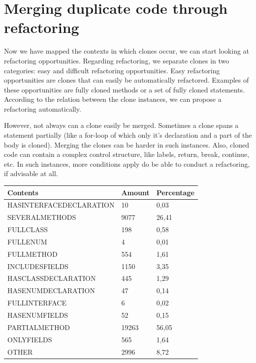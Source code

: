 \documentclass[a4paper]{article}
\begin{document}

\section{Merging duplicate code through refactoring}
Now we have mapped the contexts in which clones occur, we can start looking at refactoring opportunities. Regarding refactoring, we separate clones in two categories: easy and difficult refactoring opportunities. Easy refactoring opportunities are clones that can easily be automatically refactored. Examples of these opportunities are fully cloned methods or a set of fully cloned statements. According to the relation between the clone instances, we can propose a refactoring automatically.

However, not always can a clone easily be merged. Sometimes a clone spans a statement partially (like a for-loop of which only it's declaration and a part of the body is cloned). Merging the clones can be harder in such instances. Also, cloned code can contain a complex control structure, like labels, return, break, continue, etc. In such instances, more conditions apply do be able to conduct a refactoring, if advisable at all.

\begin{table}[H]
\begin{tabular}{|l|l|l|}
\hline
\textbf{Contents}       & \textbf{Amount} & \textbf{Percentage} \\ \hline
HASINTERFACEDECLARATION & 10              & 0,03                \\ \hline
SEVERALMETHODS          & 9077            & 26,41               \\ \hline
FULLCLASS               & 198             & 0,58                \\ \hline
FULLENUM                & 4               & 0,01                \\ \hline
FULLMETHOD              & 554             & 1,61                \\ \hline
INCLUDESFIELDS          & 1150            & 3,35                \\ \hline
HASCLASSDECLARATION     & 445             & 1,29                \\ \hline
HASENUMDECLARATION      & 47              & 0,14                \\ \hline
FULLINTERFACE           & 6               & 0,02                \\ \hline
HASENUMFIELDS           & 52              & 0,15                \\ \hline
PARTIALMETHOD           & 19263           & 56,05               \\ \hline
ONLYFIELDS              & 565             & 1,64                \\ \hline
OTHER                   & 2996            & 8,72                \\ \hline
\end{tabular}
\end{table}
\end{document}
